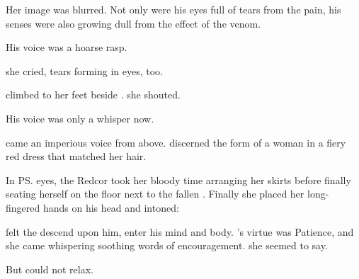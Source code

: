 Her image was blurred. Not only were his eyes full of tears from the pain, his senses were also growing dull from the effect of the venom.

His voice was a hoarse rasp. 

 she cried, tears forming in eyes, too. 

\Risvet{} climbed to her feet beside \Tiroco. 
 she shouted. 

 His voice was only a whisper now. 


 came an imperious voice from above. \Icor{} discerned the form of a woman in a fiery red dress that matched her hair. 

In \ps{\Tiroco}{} eyes, the Redcor  took her bloody time arranging her skirts before finally seating herself on the floor next to the fallen \rayuth. Finally she placed her long-fingered hands on his head and intoned: 

% 
% 


\Icor{} felt the \Sephirah{} descend upon him, enter his mind and body. 
\Ishiel's virtue was Patience, and she came whispering soothing words of encouragement. 
 she seemed to say. 

But \Icor{} could not relax. 

% 
% 

